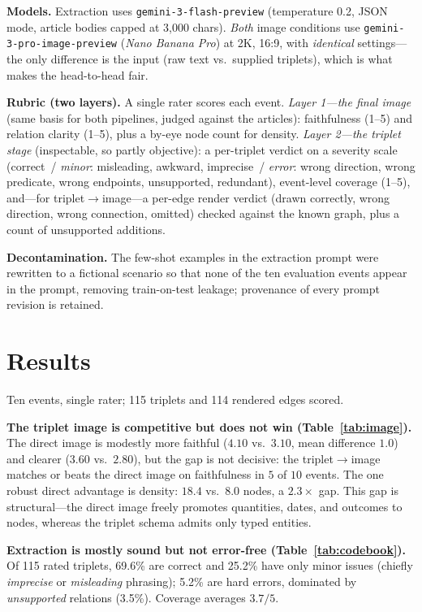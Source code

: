 \documentclass[sigconf,natbib=false, language=english]{acmart}
\begin{document}
\textbf{Models.} Extraction uses \texttt{gemini-3-flash-preview} (temperature 0.2, JSON mode, article bodies capped at 3{,}000 chars). \emph{Both} image conditions use \texttt{gemini-3-pro-image-preview} (\emph{Nano Banana Pro}) at 2K, 16:9, with \emph{identical} settings---the only difference is the input (raw text vs.\ supplied triplets), which is what makes the head-to-head fair.

\textbf{Rubric (two layers).} A single rater scores each event. \emph{Layer 1---the final image} (same basis for both pipelines, judged against the articles): faithfulness (1--5) and relation clarity (1--5), plus a by-eye node count for density. \emph{Layer 2---the triplet stage} (inspectable, so partly objective): a per-triplet verdict on a severity scale (correct~/ \emph{minor}: misleading, awkward, imprecise~/ \emph{error}: wrong direction, wrong predicate, wrong endpoints, unsupported, redundant), event-level coverage (1--5), and---for triplet$\rightarrow$image---a per-edge render verdict (drawn correctly, wrong direction, wrong connection, omitted) checked against the known graph, plus a count of unsupported additions.

\textbf{Decontamination.} The few-shot examples in the extraction prompt were rewritten to a fictional scenario so that none of the ten evaluation events appear in the prompt, removing train-on-test leakage; provenance of every prompt revision is retained.

\section{Results}
Ten events, single rater; 115 triplets and 114 rendered edges scored.

\textbf{The triplet image is competitive but does not win (Table~\ref{tab:image}).} The direct image is modestly more faithful ($4.10$ vs.\ $3.10$, mean difference $1.0$) and clearer ($3.60$ vs.\ $2.80$), but the gap is not decisive: the triplet$\rightarrow$image matches or beats the direct image on faithfulness in $5$ of $10$ events. The one robust direct advantage is density: $18.4$ vs.\ $8.0$ nodes, a $2.3\times$ gap. This gap is structural---the direct image freely promotes quantities, dates, and outcomes to nodes, whereas the triplet schema admits only typed entities.

\textbf{Extraction is mostly sound but not error-free (Table~\ref{tab:codebook}).} Of 115 rated triplets, 69.6\% are correct and 25.2\% have only minor issues (chiefly \emph{imprecise} or \emph{misleading} phrasing); 5.2\% are hard errors, dominated by \emph{unsupported} relations (3.5\%). Coverage averages $3.7/5$.
\end{document}

